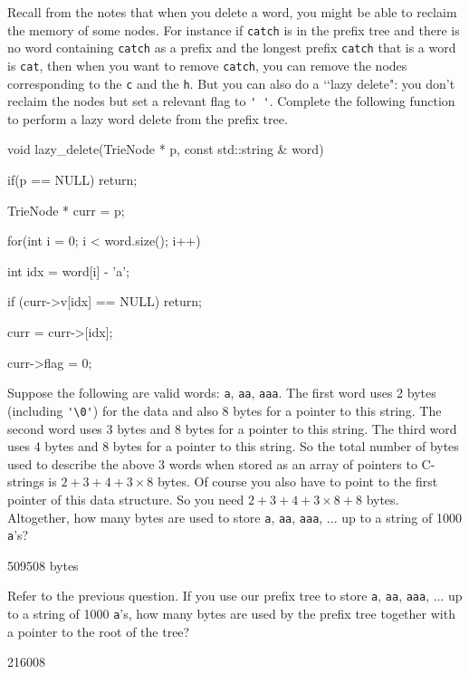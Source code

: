 \nextq
Recall from the notes that when you delete a word, you might be able to
reclaim the memory of some nodes.
For instance if \verb!catch! is in the prefix tree and
there is no word containing \verb!catch! as a prefix
and the longest prefix \verb!catch! that is a word is \verb!cat!,
then when you want to remove \verb!catch!, you can remove the nodes
corresponding to the \verb!c! and the \verb!h!.
But you can also do a \lq\lq lazy delete": you don't reclaim
the nodes but set a relevant flag to \verb!' '!.
Complete the following function to perform a lazy word delete from the
prefix tree.
\\
\ANSWER
\begin{answercode}
void lazy_delete(TrieNode * p, const std::string & word)
{
  if(p == NULL)
    return;

  TrieNode * curr = p;

  for(int i = 0; i < word.size(); i++)
  {
    int idx = word[i] - 'a';

    if (curr->v[idx] == NULL)
      return;

    curr = curr->[idx];
  }
  curr->flag = 0;
}
\end{answercode}

\nextq
Suppose the following are valid words:
\verb!a!,
\verb!aa!,
\verb!aaa!.
The first word uses 2 bytes (including \verb!'\0'!) for the data
and also 8 bytes for a pointer to this string.
The second word uses 3 bytes and 8 bytes for a pointer to this string.
The third word uses 4 bytes and 8 bytes for a pointer to this string.
So the total number of bytes used to describe the above 3 words
when stored as an array of pointers to
C-strings is $2 + 3 + 4 + 3 \times 8$ bytes.
Of course you also have to point to the first pointer of this data
structure. So you need
$2 + 3 + 4 + 3 \times 8 + 8$ bytes.
Altogether, how many bytes are used to store
\verb!a!,
\verb!aa!,
\verb!aaa!, ... up to a string of 1000 \verb!a!'s?
\\
\ANSWER
\begin{answercode}
509508 bytes
\end{answercode}

\nextq
Refer to the previous question.
If you use our prefix tree to store
\verb!a!,
\verb!aa!,
\verb!aaa!, ... up to a string of 1000 \verb!a!'s,
how many bytes are used by the prefix tree together with a pointer
to the root of the tree?
\\
\ANSWER
\begin{answercode}
216008
\end{answercode}


